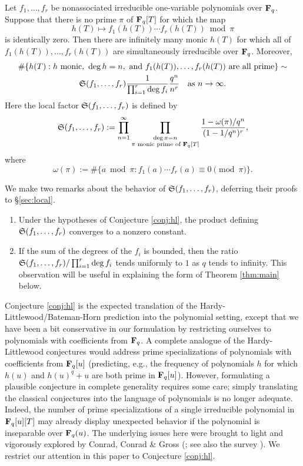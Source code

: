 \documentclass[a4paper]{compositio}
\begin{document}
\begin{conj}\label{conj:hl} Let $f_1, \dots, f_r$ be nonassociated irreducible
one-variable polynomials over $\mathbf{F}_q$. Suppose that there is no prime
$\pi$ of $\mathbf{F}_q[T]$ for which the map
\[ h(T) \mapsto f_1(h(T)) \cdots f_r(h(T)) \bmod \pi \]
is identically zero. Then there are infinitely many monic $h(T)$ for
which all of $f_1(h(T)), \dots, f_r(h(T))$ are simultaneously
irreducible over $\mathbf{F}_q$. Moreover,
\begin{multline*} \#\{h(T): h \text{ monic},~\deg{h}=n, \text{ and $f_1(h(T)), \dots, f_r(h(T))$
are all prime}\} \sim
\\ \mathfrak{S}(f_1,\dots,f_r)  \frac{1}{\prod_{i=1}^{r}\deg{f_i}}\frac{q^n}{n^r}  \quad
\text{as $n\to\infty$}. \end{multline*} Here the local factor
$\mathfrak{S}(f_1, \dots, f_r)$ is defined by
\[ \mathfrak{S}(f_1, \dots, f_r) := \prod_{n=1}^{\infty}\prod_{\substack{\deg{\pi}=n \\ \pi \text{ monic prime of
$\mathbf{F}_q[T]$}}}\frac{1- \omega(\pi)/q^{n}}{(1-1/q^{n})^r},
\] where
\[ \omega(\pi) := \#\{a \bmod{\pi}: f_1(a) \cdots f_r(a) \equiv 0
\pmod{\pi}\}. \]
\end{conj}
\begin{rmks} We make two remarks about the behavior of $\mathfrak{S}(f_1, \dots, f_r)$, deferring their proofs
to \S\ref{sec:local}.
\begin{enumerate}
\item Under the hypotheses of Conjecture \ref{conj:hl}, the product defining
$\mathfrak{S}(f_1,\dots,f_r)$ converges to a nonzero constant.
\item If the sum of the degrees of the $f_i$ is bounded, then the ratio $\mathfrak{S}(f_1, \dots,
f_r)/\prod_{i=1}^r{\deg{f_i}}$ tends uniformly to $1$ as $q$ tends
to infinity. This observation will be useful in explaining the form
of Theorem \ref{thm:main} below.
\end{enumerate}
\end{rmks}

Conjecture \ref{conj:hl} is the expected translation of the
Hardy-Littlewood/Bateman-Horn prediction into the polynomial
setting, except that we have been a bit conservative in our
formulation by restricting ourselves to polynomials with
coefficients from $\mathbf{F}_q$. A complete analogue of the
Hardy-Littlewood conjectures would address prime specializations of
polynomials with coefficients from $\mathbf{F}_q[u]$ (predicting, e.g., the
frequency of polynomials $h$ for which $h(u)$ and $h(u)^q+u$ are
both prime in $\mathbf{F}_q[u]$). However, formulating a plausible
conjecture in complete generality requires some care; simply
translating the classical conjectures into the language of
polynomials is no longer adequate. Indeed, the number of prime
specializations of a single irreducible polynomial in $\mathbf{F}_q[u][T]$
may already display unexpected behavior if the polynomial is
inseparable over $\mathbf{F}_q(u)$. The underlying issues here were brought
to light and vigorously explored by Conrad, Conrad \& Gross
(\cite{ccg03}; see also the survey \cite{conrad05}). We restrict our
attention in this paper to Conjecture \ref{conj:hl}.
\end{document}
